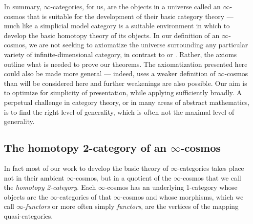 \documentclass[12pt,reqno]{amsart}
\theoremstyle{plain}
\theoremstyle{definition}
\theoremstyle{remark}
\numberwithin{equation}{subsection}
\begin{document}
In summary, $\infty$-categories, for us, are the objects in a universe called an $\infty$-cosmos that is suitable for the development of their basic category theory --- much like a simplicial model category is a suitable environment in which to develop the basic homotopy theory of its objects. In our definition of an $\infty$-cosmos, we are not seeking to axiomatize the universe surrounding any particular variety of infinite-dimensional category, in contrast to \cite{Toen:2005vu}  or   \cite{BSP:2011ot}. Rather, the axioms outline what is needed to prove our theorems. The axiomatization presented here could also be made more general --- indeed, \cite{RiehlVerity:2015fy} uses a weaker definition of $\infty$-cosmos than will be considered here and further weakenings are also possible. Our aim is to optimize for simplicity of presentation, while applying sufficiently broadly. A perpetual challenge in category theory, or in many areas of abstract mathematics, is  to find the right level of generality, which is often not the maximal level of generality.

\subsection{The homotopy 2-category of an \texorpdfstring{$\infty$}{infinity}-cosmos}

In fact most of our work to develop the basic theory of $\infty$-categories takes place not in their ambient $\infty$-cosmos, but in a quotient of the $\infty$-cosmos that we call the \emph{homotopy 2-category}. Each $\infty$-cosmos has an underlying 1-category whose objects are the $\infty$-categories of that $\infty$-cosmos and whose morphisms, which we call $\infty$-\emph{functors} or more often simply \emph{functors}, are the vertices of the mapping quasi-categories. 
\end{document}
